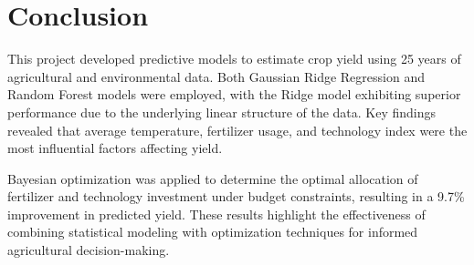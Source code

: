\section{Conclusion}

This project developed predictive models to estimate crop yield using 25 years of agricultural and environmental data. Both Gaussian Ridge Regression and Random Forest models were employed, with the Ridge model exhibiting superior performance due to the underlying linear structure of the data. Key findings revealed that average temperature, fertilizer usage, and technology index were the most influential factors affecting yield.

Bayesian optimization was applied to determine the optimal allocation of fertilizer and technology investment under budget constraints, resulting in a 9.7\% improvement in predicted yield. These results highlight the effectiveness of combining statistical modeling with optimization techniques for informed agricultural decision-making.
